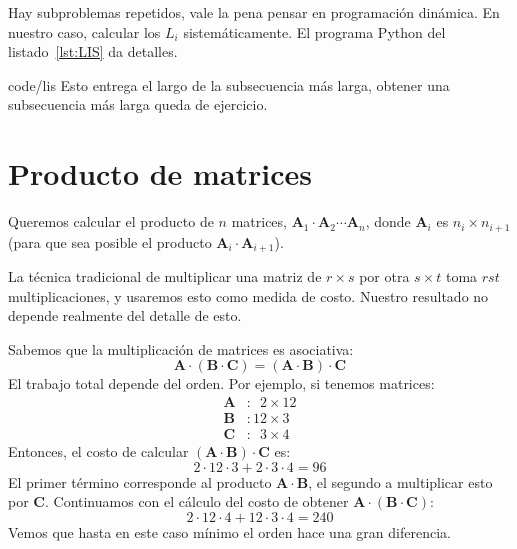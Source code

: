   Hay subproblemas repetidos,
  vale la pena pensar en programación dinámica.
  En nuestro caso,
  calcular los \(L_i\) sistemáticamente.
  El programa Python del listado~\ref{lst:LIS} da detalles.
  
		  {code/lis}
  Esto entrega el largo de la subsecuencia más larga,
  obtener una subsecuencia más larga queda de ejercicio.

\section{Producto de matrices}
\label{sec:producto-de-matrices}

  Queremos calcular el producto de \(n\) matrices,
  \(\mathbf{A}_1 \cdot \mathbf{A}_2 \dotsm \mathbf{A}_n\),
  donde \(\mathbf{A}_i\) es \(n_i \times n_{i + 1}\)
  (para que sea posible el producto \(\mathbf{A}_i \cdot \mathbf{A}_{i + 1}\)).

  La técnica tradicional
  de multiplicar una matriz de \(r \times s\) por otra \(s \times t\)
  toma \(r s t\) multiplicaciones,
  y usaremos esto como medida de costo.
  Nuestro resultado no depende realmente del detalle de esto.

  Sabemos que la multiplicación de matrices es asociativa:
  \begin{equation*}
    \mathbf{A} \cdot (\mathbf{B} \cdot \mathbf{C})
      = (\mathbf{A} \cdot \mathbf{B}) \cdot \mathbf{C}
  \end{equation*}
  El trabajo total depende del orden.
  Por ejemplo,
  si tenemos matrices:
  \begin{align*}
    \mathbf{A} &\colon \phantom{0}2 \times 12 \\
    \mathbf{B} &\colon 12 \times 3  \\
    \mathbf{C} &\colon \phantom{0}3 \times 4
  \end{align*}
  Entonces,
  el costo de calcular \((\mathbf{A} \cdot \mathbf{B}) \cdot \mathbf{C}\) es:
  \begin{equation*}
    2 \cdot 12 \cdot 3 + 2 \cdot 3 \cdot 4
      = 96
  \end{equation*}
  El primer término corresponde al producto \(\mathbf{A} \cdot \mathbf{B}\),
  el segundo a multiplicar esto por \(\mathbf{C}\).
  Continuamos con el cálculo del costo
  de obtener \(\mathbf{A} \cdot (\mathbf{B} \cdot \mathbf{C})\):
  \begin{equation*}
    2 \cdot 12 \cdot 4 + 12 \cdot 3 \cdot 4
      = 240
  \end{equation*}
  Vemos que hasta en este caso mínimo el orden hace una gran diferencia.

